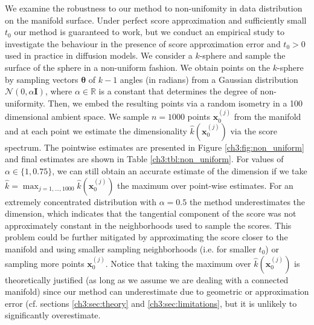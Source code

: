    We examine the robustness to our method to non-unifomity in data distribution on the manifold surface. Under perfect score approximation and sufficiently small $t_0$ our method is guaranteed to work, but we conduct an empirical study to investigate the behaviour in the presence of score approximation error and $t_0 > 0$ used in practice in diffusion models. We consider a $k$-sphere and sample the surface of the sphere in a non-uniform fashion. We obtain points on the $k$-sphere by sampling vectors $\pmb \theta$ of $k-1$ angles (in radians) from a Gaussian distribution $\mathcal{N}(0, \alpha \mathbf{I})$, where $\alpha \in \mathbb{R}$ is a constant that determines the degree of non-uniformity. Then, we embed the resulting points via a random isometry in a 100 dimensional ambient space. We sample $n=1000$ points $\textbf{x}_0^{(j)}$ from the manifold and at each point we estimate the dimensionality $\hat{k}(\textbf{x}_0^{(j)})$ via the score spectrum. The pointwise estimates are presented in Figure \ref{ch3:fig:non_uniform} and final estimates are shown in Table \ref{ch3:tbl:non_uniform}. For values of $\alpha \in \{1, 0.75\}$, we can still obtain an accurate estimate of the dimension if we take $\hat{k} = \max_{j=1,...,1000} \hat{k}(\textbf{x}_0^{(j)})$ the maximum over point-wise estimates. For an extremely concentrated distribution with $\alpha = 0.5$ the method underestimates the dimension, which indicates that the tangential component of the score was not approximately constant in the neighborhoods used to sample the scores. This problem could be further mitigated by approximating the score closer to the manifold and using smaller sampling neighborhoods (i.e. for smaller $t_0$) or sampling more points $\textbf{x}_0^{(j)}$. Notice that taking the maximum over $\hat{k}(\textbf{x}_0^{(j)})$ is theoretically justified (as long as we assume we are dealing with a connected manifold) since our method can underestimate due to geometric or approximation error (cf. sections \ref{ch3:sec:theory} and \ref{ch3:sec:limitations}, but it is unlikely to significantly overestimate.

